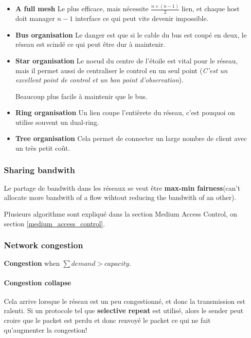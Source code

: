 \begin{itemize}
    \item \textbf{A full mesh}
    Le plus efficace, mais nécessite $\frac{n \times (n-1)}{2}$ lien, et chaque
    host doit manager $n-1$ interface ce qui peut vite devenir impossible.

    \item \textbf{Bus organisation}
    Le danger est que si le cable du bus est coupé en deux, le réseau est scindé
    ce qui peut être dur à maintenir.

    \item \textbf{Star organisation}
    Le noeud du centre de l'étoile est vital pour le réseau, mais il permet aussi
    de centraliser le control en un seul point (\textit{C'est un excellent point de
    control et un bon point d'observation}).

    Beaucoup plus facile à maintenir que le bus.

    \item \textbf{Ring organisation}
    Un lien coupe l'entièrete du réseau, c'est pouquoi on utilise souvent un dual-ring.

    \item \textbf{Tree organisation}
    Cela permet de connecter un large nombre de client avec un très petit coût.
\end{itemize}

\subsubsection{Sharing bandwith}

Le partage de bandwith dans les réseaux se veut être \textbf{max-min fairness}(can't allocate more bandwith 
of a flow wihtout reducing the bandwith of an other).

Plusieurs algorithme sont expliqué dans la section Medium Access Control,
on section \ref{medium_access_control}.

\subsubsection{Network congestion}

\textbf{Congestion} when $\sum demand > capacity$.

\paragraph{Congestion collapse}
Cela arrive lorsque le réseau est un peu congestionné, et donc la transmission est ralenti.
Si un protocole tel que \textbf{selective repeat} est utilisé, alors le sender peut
croire que le packet est perdu et donc renvoyé le packet ce qui ne fait qu'augmenter
la congestion!

